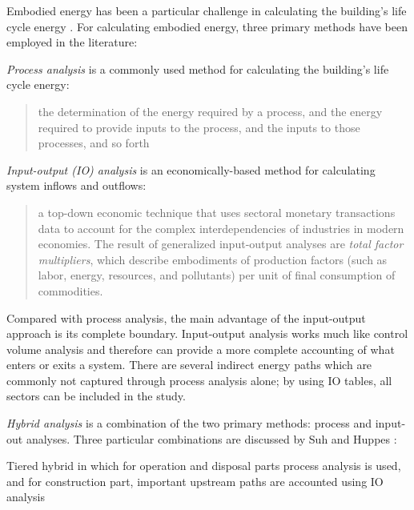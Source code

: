 \documentclass[10pt]{article}
\begin{document}
Embodied energy has been a particular challenge in calculating the building's life cycle energy \cite{dixit2010identification}. For calculating embodied energy, three primary methods have been employed in the literature:

\textit{Process analysis} is a commonly used method for calculating the building's life cycle energy:

\begin{quote}
    the determination of the energy required by a process, and the energy required to  provide inputs to the process, and the inputs to those processes, and so forth \cite{treloar1998comprehensive}
\end{quote}


\textit{Input-output (IO) analysis} is an economically-based method for calculating system inflows and outflows:

\begin{quote}
    a  top-down economic technique that uses sectoral monetary
transactions data to account for the complex interdependencies of industries in modern economies. The result of generalized input-output analyses are \textit{total factor multipliers}, which describe embodiments of production factors (such
as labor, energy, resources, and pollutants) per unit of final consumption of commodities. \cite{Lenzen2000-vu}
\end{quote}


Compared with process analysis, the main advantage of the input-output approach is its complete boundary. Input-output analysis works much like control volume analysis and therefore can provide a more complete accounting of what enters or exits a system. There are several indirect energy paths which are commonly not captured through process analysis alone; by using IO tables, all sectors can be included in the study. 


\textit{Hybrid analysis} is a combination of the two primary methods: process and input-out analyses. Three particular combinations are discussed by Suh and Huppes \cite{suh2005methods}:

Tiered hybrid in which for operation and disposal parts process analysis is used, and for construction part, important upstream paths are accounted using IO analysis
\end{document}
